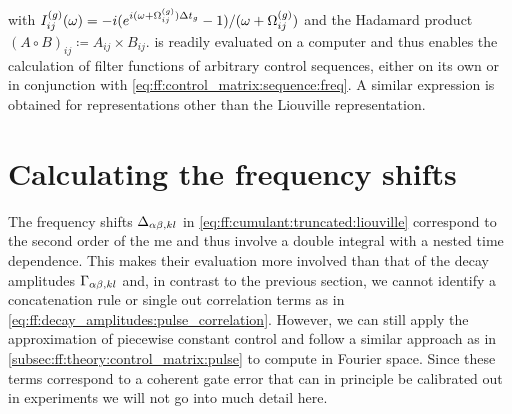 with $I_{ij}^{(g)}(\omega) = -i(e^{i(\omega + \Omega_{ij}^{(g)})\Delta t_g} - 1)/(\omega + \Omega_{ij}^{(g)})$ and the Hadamard product $(A\circ B)_{ij}\coloneqq A_{ij}\times B_{ij}$.
 is readily evaluated on a computer and thus enables the calculation of filter functions of arbitrary control sequences, either on its own or in conjunction with \cref{eq:ff:control_matrix:sequence:freq}.
A similar expression is obtained for representations other than the Liouville representation.

\section{Calculating the frequency shifts}\label{sec:ff:theory:frequency_shifts}
The frequency shifts $\Delta_{\alpha\beta,kl}$ in \cref{eq:ff:cumulant:truncated:liouville} correspond to the second order of the \gls{me} and thus involve a double integral with a nested time dependence.
This makes their evaluation more involved than that of the decay amplitudes $\Gamma_{\alpha\beta,kl}$ and, in contrast to the previous section, we cannot identify a concatenation rule or single out correlation terms as in \cref{eq:ff:decay_amplitudes:pulse_correlation}.
However, we can still apply the approximation of piecewise constant control and follow a similar approach as in \cref{subsec:ff:theory:control_matrix:pulse} to compute \freqshifts in Fourier space.
Since these terms correspond to a coherent gate error that can in principle be calibrated out in experiments we will not go into much detail here.

